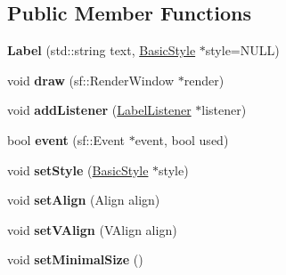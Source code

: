 \subsection*{Public Member Functions}
\begin{DoxyCompactItemize}
\item 
\hypertarget{classgraphics_1_1_label_a37674c45c20e88d8fe82960553168216}{{\bfseries Label} (std\-::string text, \hyperlink{classgraphics_1_1_basic_style}{Basic\-Style} $\ast$style=N\-U\-L\-L)}\label{classgraphics_1_1_label_a37674c45c20e88d8fe82960553168216}

\item 
\hypertarget{classgraphics_1_1_label_afdbae4b3175ad7ce438a1eb0873de954}{void {\bfseries draw} (sf\-::\-Render\-Window $\ast$render)}\label{classgraphics_1_1_label_afdbae4b3175ad7ce438a1eb0873de954}

\item 
\hypertarget{classgraphics_1_1_label_a7fb8f1bb476e7955eb18bea30062ce02}{void {\bfseries add\-Listener} (\hyperlink{classgraphics_1_1_label_listener}{Label\-Listener} $\ast$listener)}\label{classgraphics_1_1_label_a7fb8f1bb476e7955eb18bea30062ce02}

\item 
\hypertarget{classgraphics_1_1_label_a5896834606fbab1837a10229a5266a6e}{bool {\bfseries event} (sf\-::\-Event $\ast$event, bool used)}\label{classgraphics_1_1_label_a5896834606fbab1837a10229a5266a6e}

\item 
\hypertarget{classgraphics_1_1_label_af9ef3e630df7f41e818d94b70a2ddb3b}{void {\bfseries set\-Style} (\hyperlink{classgraphics_1_1_basic_style}{Basic\-Style} $\ast$style)}\label{classgraphics_1_1_label_af9ef3e630df7f41e818d94b70a2ddb3b}

\item 
\hypertarget{classgraphics_1_1_label_a0f47bd187d3a307c7b0c88a15a0fea40}{void {\bfseries set\-Align} (Align align)}\label{classgraphics_1_1_label_a0f47bd187d3a307c7b0c88a15a0fea40}

\item 
\hypertarget{classgraphics_1_1_label_a8754788953f8d6a79f8501e68343a357}{void {\bfseries set\-V\-Align} (V\-Align align)}\label{classgraphics_1_1_label_a8754788953f8d6a79f8501e68343a357}

\item 
\hypertarget{classgraphics_1_1_label_ab13e1cfbe67eecff4a22793ec9b340c6}{void {\bfseries set\-Minimal\-Size} ()}\label{classgraphics_1_1_label_ab13e1cfbe67eecff4a22793ec9b340c6}


\end{DoxyCompactItemize}

